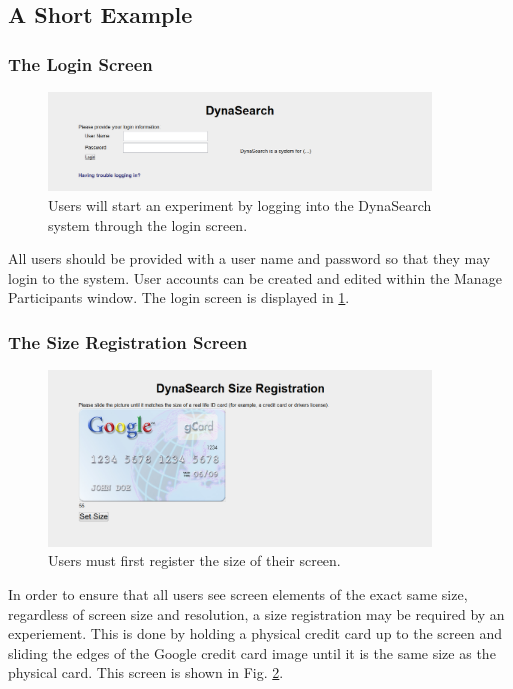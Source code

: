 \documentclass[article]{ij4uq}              %
\begin{document}
\subsection{A Short Example}

\subsubsection{The Login Screen}

\begin{figure}[h!]
 \centering
 \includegraphics[width=4.0in]{figures/login.png}
 \caption{Users will start an experiment by logging into the DynaSearch system through the login screen.}
 \label{fig:login}
\end{figure}
\FloatBarrier

All users should be provided with a user name and password so that they may login to the system. User accounts can be created and edited within the Manage Participants window. The login screen is displayed in \ref{fig:login}.

\subsubsection{The Size Registration Screen}

\begin{figure}[h!]
 \centering
 \includegraphics[width=4.0in]{figures/size_reg.png}
 \caption{Users must first register the size of their screen.}
 \label{fig:sizereg}
\end{figure}
\FloatBarrier


In order to ensure that all users see screen elements of the exact same size, regardless of screen size and resolution, a size registration may be required by an experiement. This is done by holding a physical credit card up to the screen and sliding the edges of the Google credit card image until it is the same size as the physical card. This screen is shown in Fig. \ref{fig:sizereg}.
\end{document}
